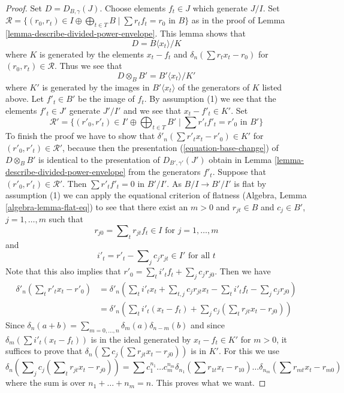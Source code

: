 \begin{proof}
Set $D = D_{B, \gamma}(J)$. Choose elements $f_t \in J$ which generate $J/I$.
Set $\mathcal{R} = \{(r_0, r_t) \in I \oplus \bigoplus\nolimits_{t \in T} B
\mid \sum r_t f_t = r_0 \text{ in }B\}$ as in the proof of
Lemma \ref{lemma-describe-divided-power-envelope}. This lemma shows that
$$
D = B\langle x_t \rangle/ K
$$
where $K$ is generated by the elements $x_t - f_t$ and
$\delta_n(\sum r_t x_t - r_0)$ for $(r_0, r_t) \in \mathcal{R}$.
Thus we see that
\begin{equation}
\label{equation-base-change}
D \otimes_B B' = B'\langle x_t \rangle/K'
\end{equation}
where $K'$ is generated by the images in $B'\langle x_t \rangle$
of the generators of $K$ listed above. Let $f'_t \in B'$ be the image
of $f_t$. By assumption (1) we see that the elements $f'_t \in J'$
generate $J'/I'$ and we see that $x_t - f'_t \in K'$. Set
$$
\mathcal{R}' =
\{(r'_0, r'_t) \in I' \oplus \bigoplus\nolimits_{t \in T} B'
\mid \sum r'_t f'_t = r'_0 \text{ in }B'\}
$$
To finish the proof we have to show that
$\delta'_n(\sum r'_t x_t - r'_0) \in K'$ for
$(r'_0, r'_t) \in \mathcal{R}'$, because then the presentation
(\ref{equation-base-change}) of $D \otimes_B B'$ is identical
to the presentation of $D_{B', \gamma'}(J')$ obtain in
Lemma \ref{lemma-describe-divided-power-envelope} from the generators $f'_t$.
Suppose that $(r'_0, r'_t) \in \mathcal{R}'$. Then
$\sum r'_t f'_t = 0$ in $B'/I'$. As $B/I \to B'/I'$ is flat by
assumption (1) we can apply the equational criterion of flatness
(Algebra, Lemma \ref{algebra-lemma-flat-eq}) to see
that there exist an $m > 0$ and
$r_{jt} \in B$ and $c_j \in B'$, $j = 1, \ldots, m$ such
that
$$
r_{j0} = \sum\nolimits_t r_{jt} f_t  \in I \text{ for } j = 1, \ldots, m
$$
and
$$
i'_t  = r'_t - \sum\nolimits_j c_j r_{jt} \in I' \text{ for all }t
$$
Note that this also implies that
$r'_0 = \sum_t i'_t f_t + \sum_j c_j r_{j0}$.
Then we have
\begin{align*}
\delta'_n(\sum\nolimits_t r'_t x_t  - r'_0)
& =
\delta'_n(
\sum\nolimits_t i'_t x_t +
\sum\nolimits_{t, j} c_j r_{jt} x_t -
\sum\nolimits_t i'_t f_t -
\sum\nolimits_j c_j r_{j0}) \\
& =
\delta'_n(
\sum\nolimits_t i'_t(x_t - f_t) +
\sum\nolimits_j c_j (\sum\nolimits_t r_{jt} x_t  - r_{j0}))
\end{align*}
Since $\delta_n(a + b) = \sum_{m = 0, \ldots, n} \delta_m(a) \delta_{n - m}(b)$
and since $\delta_m(\sum i'_t(x_t - f_t))$ is in the ideal
generated by $x_t - f_t \in K'$ for $m > 0$, it suffices to prove that
$\delta_n(\sum c_j (\sum r_{jt} x_t  - r_{j0}))$ is in $K'$.
For this we use
$$
\delta_n(\sum\nolimits_j c_j (\sum\nolimits_t r_{jt} x_t  - r_{j0}))
=
\sum c_1^{n_1} \ldots c_m^{n_m}
\delta_{n_1}(\sum r_{1t} x_t  - r_{10}) \ldots
\delta_{n_m}(\sum r_{mt} x_t  - r_{m0})
$$
where the sum is over $n_1 + \ldots + n_m = n$. This proves what we want.
\end{proof}





